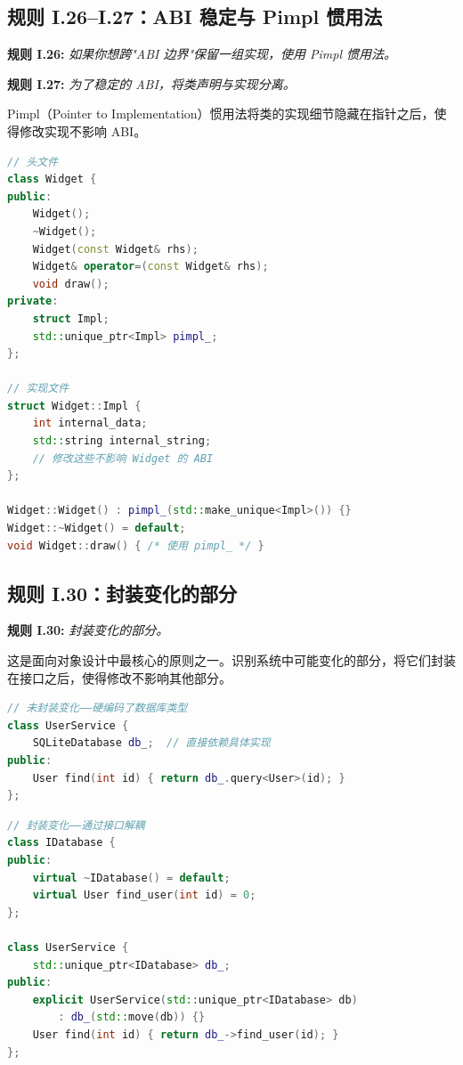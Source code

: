 \subsection{规则 I.26--I.27：ABI 稳定与 Pimpl 惯用法}

\textbf{规则 I.26:} \textit{如果你想跨"ABI 边界"保留一组实现，使用 Pimpl 惯用法。}

\textbf{规则 I.27:} \textit{为了稳定的 ABI，将类声明与实现分离。}

Pimpl（Pointer to Implementation）惯用法将类的实现细节隐藏在指针之后，使得修改实现不影响 ABI。

\begin{lstlisting}[language=C++]
// 头文件
class Widget {
public:
    Widget();
    ~Widget();
    Widget(const Widget& rhs);
    Widget& operator=(const Widget& rhs);
    void draw();
private:
    struct Impl;
    std::unique_ptr<Impl> pimpl_;
};

// 实现文件
struct Widget::Impl {
    int internal_data;
    std::string internal_string;
    // 修改这些不影响 Widget 的 ABI
};

Widget::Widget() : pimpl_(std::make_unique<Impl>()) {}
Widget::~Widget() = default;
void Widget::draw() { /* 使用 pimpl_ */ }
\end{lstlisting}

\subsection{规则 I.30：封装变化的部分}

\textbf{规则 I.30:} \textit{封装变化的部分。}

这是面向对象设计中最核心的原则之一。识别系统中可能变化的部分，将它们封装在接口之后，使得修改不影响其他部分。

\begin{lstlisting}[language=C++]
// 未封装变化——硬编码了数据库类型
class UserService {
    SQLiteDatabase db_;  // 直接依赖具体实现
public:
    User find(int id) { return db_.query<User>(id); }
};
\end{lstlisting}

\begin{lstlisting}[language=C++]
// 封装变化——通过接口解耦
class IDatabase {
public:
    virtual ~IDatabase() = default;
    virtual User find_user(int id) = 0;
};

class UserService {
    std::unique_ptr<IDatabase> db_;
public:
    explicit UserService(std::unique_ptr<IDatabase> db)
        : db_(std::move(db)) {}
    User find(int id) { return db_->find_user(id); }
};
\end{lstlisting}

